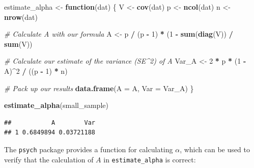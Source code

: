 \documentclass[
]{book}
\newenvironment{Shaded}{\begin{snugshade}}{\end{snugshade}}
\newcommand{\AttributeTok}[1]{\textcolor[rgb]{0.13,0.29,0.53}{#1}}
\newcommand{\CommentTok}[1]{\textcolor[rgb]{0.56,0.35,0.01}{\textit{#1}}}
\newcommand{\ControlFlowTok}[1]{\textcolor[rgb]{0.13,0.29,0.53}{\textbf{#1}}}
\newcommand{\DecValTok}[1]{\textcolor[rgb]{0.00,0.00,0.81}{#1}}
\newcommand{\FunctionTok}[1]{\textcolor[rgb]{0.13,0.29,0.53}{\textbf{#1}}}
\newcommand{\NormalTok}[1]{#1}
\newcommand{\OtherTok}[1]{\textcolor[rgb]{0.56,0.35,0.01}{#1}}
\newcommand{\SpecialCharTok}[1]{\textcolor[rgb]{0.81,0.36,0.00}{\textbf{#1}}}
\begin{document}
\begin{Shaded}
\begin{Highlighting}[]
\NormalTok{estimate\_alpha }\OtherTok{\textless{}{-}} \ControlFlowTok{function}\NormalTok{(dat) \{}
\NormalTok{  V }\OtherTok{\textless{}{-}} \FunctionTok{cov}\NormalTok{(dat)}
\NormalTok{  p }\OtherTok{\textless{}{-}} \FunctionTok{ncol}\NormalTok{(dat)}
\NormalTok{  n }\OtherTok{\textless{}{-}} \FunctionTok{nrow}\NormalTok{(dat)}
  
  \CommentTok{\# Calculate A with our formula}
\NormalTok{  A }\OtherTok{\textless{}{-}}\NormalTok{ p }\SpecialCharTok{/}\NormalTok{ (p }\SpecialCharTok{{-}} \DecValTok{1}\NormalTok{) }\SpecialCharTok{*}\NormalTok{ (}\DecValTok{1} \SpecialCharTok{{-}} \FunctionTok{sum}\NormalTok{(}\FunctionTok{diag}\NormalTok{(V)) }\SpecialCharTok{/} \FunctionTok{sum}\NormalTok{(V))}
  
  \CommentTok{\# Calculate our estimate of the variance (SE\^{}2) of A}
\NormalTok{  Var\_A }\OtherTok{\textless{}{-}} \DecValTok{2} \SpecialCharTok{*}\NormalTok{ p }\SpecialCharTok{*}\NormalTok{ (}\DecValTok{1} \SpecialCharTok{{-}}\NormalTok{ A)}\SpecialCharTok{\^{}}\DecValTok{2} \SpecialCharTok{/}\NormalTok{ ((p }\SpecialCharTok{{-}} \DecValTok{1}\NormalTok{) }\SpecialCharTok{*}\NormalTok{ n)}
  
  \CommentTok{\# Pack up our results}
  \FunctionTok{data.frame}\NormalTok{(}\AttributeTok{A =}\NormalTok{ A, }\AttributeTok{Var =}\NormalTok{ Var\_A)}
\NormalTok{\}}

\FunctionTok{estimate\_alpha}\NormalTok{(small\_sample)}
\end{Highlighting}
\end{Shaded}

\begin{verbatim}
##           A        Var
## 1 0.6849894 0.03721188
\end{verbatim}

The \texttt{psych} package provides a function for calculating \(\alpha\), which can be used to verify that the calculation of \(A\) in \texttt{estimate\_alpha} is correct:

\begin{Shaded}
\end{Shaded}
\end{document}
